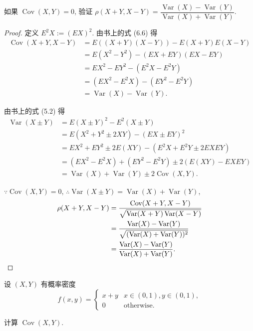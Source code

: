\documentclass[color=black,device=normal,lang=cn]{elegantnote}
\numberwithin{equation}{section}
\theoremstyle{plain}
\numberwithin{exercise}{exsection}
\begin{document}
\begin{exercise}%
    如果 $\operatorname{Cov}(X,Y)=0$, 验证 $\rho(X+Y,X-Y)=\dfrac{\operatorname{Var}(X)-\operatorname{Var}(Y)}{\operatorname{Var}(X)+\operatorname{Var}(Y)}$.
\end{exercise}
\begin{proof}
    定义 $E^2X:=(EX)^2$. 由书上的式 (6.6) 得
    \begin{align*}
        \operatorname{Cov}(X+Y,X-Y) & =E((X+Y)(X-Y))-E(X+Y)E(X-Y) \\
        & =E(X^2-Y^2)-(EX+EY)(EX-EY) \\
        & =EX^2-EY^2-(E^2X-E^2Y) \\
        & =(EX^2-E^2X)-(EY^2-E^2Y) \\
        & =\operatorname{Var}(X)-\operatorname{Var}(Y).
    \end{align*}

    由书上的式 (5.2) 得
    \begin{align*}
        \operatorname{Var}(X\pm Y) & =E(X\pm Y)^2-E^2(X\pm Y) \\
        & =E(X^2+Y^2\pm2XY)-(EX\pm EY)^2 \\
        & =EX^2+EY^2\pm2E(XY)-(E^2X+E^2Y\pm2EXEY) \\
        & =(EX^2-E^2X)+(EY^2-E^2Y)\pm2(E(XY)-EXEY) \\
        & =\operatorname{Var}(X)+\operatorname{Var}(Y)\pm2\operatorname{Cov}(X,Y).
    \end{align*}

    $\because\operatorname{Cov}(X,Y)=0$, $\therefore\operatorname{Var}(X\pm Y)=\operatorname{Var}(X)+\operatorname{Var}(Y)$,
    \begin{align*}
        \rho(X+Y,X-Y) & =\dfrac{\operatorname{Cov}(X+Y,X-Y)}{\sqrt{\operatorname{Var}(X+Y)\operatorname{Var}(X-Y)}} \\
        & =\dfrac{\operatorname{Var}(X)-\operatorname{Var}(Y)}{\sqrt{(\operatorname{Var}(X)+\operatorname{Var}(Y))^2}} \\
        & =\dfrac{\operatorname{Var}(X)-\operatorname{Var}(Y)}{\operatorname{Var}(X)+\operatorname{Var}(Y)}.\qedhere
    \end{align*}
\end{proof}
\begin{exercise}%
    设 $(X,Y)$ 有概率密度
    \[f(x,y)=\begin{cases}
        x+y & x\in(0,1),y\in(0,1), \\
        0 & \text{otherwise}.
    \end{cases}\]

    计算 $\operatorname{Cov}(X,Y)$.
\end{exercise}
\end{document}

